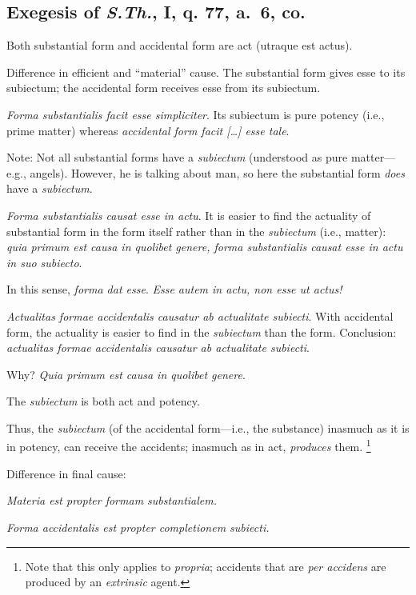 \begin{DONE}

\section{Exegesis of \emph{S.Th.}, I, q. 77, a.~6, co.}

Both substantial form and accidental form are act (utraque est actus).

Difference in efficient and \enquote{material} cause.
The substantial form gives esse to its subiectum; the accidental form receives esse from its subiectum.

\emph{Forma substantialis facit esse simpliciter}.
Its subiectum is pure potency (i.e., prime matter) whereas \emph{accidental form facit [\ldots] esse tale}.

Note: Not all substantial forms have a \emph{subiectum} (understood as pure matter—e.g., angels). However, he is talking about man, so here the substantial form \emph{does} have a \emph{subiectum}.

\emph{Forma substantialis causat esse in actu}.
It is easier to find the actuality of substantial form in the form itself rather than in the \emph{subiectum} (i.e., matter): \emph{quia primum est causa in quolibet genere, forma substantialis causat esse in actu in suo subiecto}.

In this sense, \emph{forma dat esse}. \emph{Esse autem in actu, non esse ut actus!}

\emph{Actualitas formae accidentalis causatur ab actualitate subiecti}.
With accidental form, the actuality is easier to find in the \emph{subiectum} than the form. Conclusion: \emph{actualitas formae accidentalis causatur ab actualitate subiecti}.

Why? \emph{Quia primum est causa in quolibet genere}.

The \emph{subiectum} is both act and potency.

Thus, the \emph{subiectum} (of the accidental form—i.e., the substance) inasmuch as it is in potency, can receive the accidents; inasmuch as in act, \emph{produces} them.%
%
\footnote{Note that this only applies to \emph{propria}; accidents that are \emph{per accidens} are produced by an \emph{extrinsic} agent.}

Difference in final cause:

\emph{Materia est propter formam substantialem.}

\emph{Forma accidentalis est propter completionem subiecti.}


\end{DONE}
